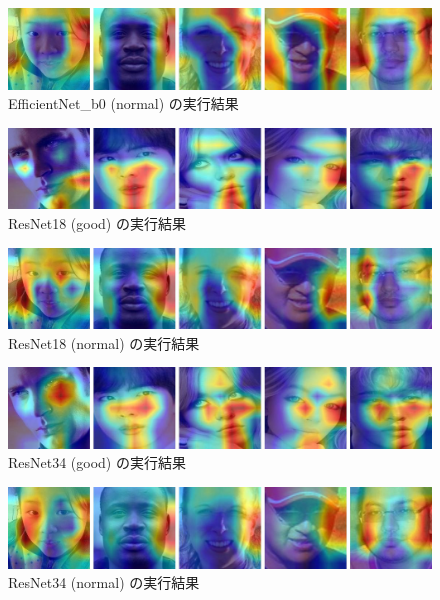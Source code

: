 \documentclass[a4paper,11pt,titlepage]{jsarticle}
\begin{document}
\begin{figure}[H]
    \centering
    \includegraphics[width=1.1\textwidth]{efficientnetb0(normal).jpg}
    \caption{EfficientNet\_b0 (normal) の実行結果}
    \label{fig:append_efficientnetb0(normal)}
\end{figure}

\begin{figure}[H]
    \centering
    \includegraphics[width=1.1\textwidth]{resent18(good).jpg}
    \caption{ResNet18 (good) の実行結果}
    \label{fig:append_resent18(good)}
\end{figure}

\begin{figure}[H]
    \centering
    \includegraphics[width=1.1\textwidth]{resnet18(normal).jpg}
    \caption{ResNet18 (normal) の実行結果}
    \label{fig:append_resnet18(normal)}
\end{figure}

\begin{figure}[H]
    \centering
    \includegraphics[width=1.1\textwidth]{resnet34(good).jpg}
    \caption{ResNet34 (good) の実行結果}
    \label{fig:append_resnet34(good)}
\end{figure}

\begin{figure}[H]
    \centering
    \includegraphics[width=1.1\textwidth]{resnet34(normal).jpg}
    \caption{ResNet34 (normal) の実行結果}
    \label{fig:append_resnet34(normal)}
\end{figure}
\end{document}
